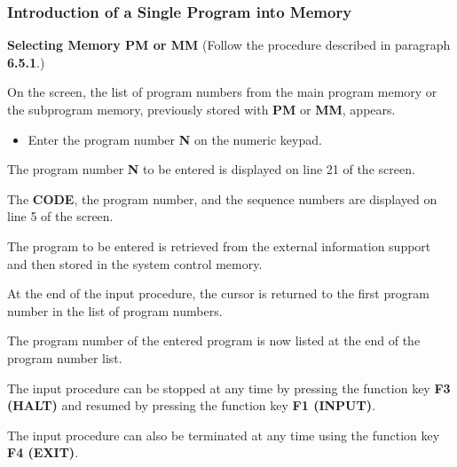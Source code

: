 \subsubsection{Introduction of a Single Program into Memory}

\textbf{Selecting Memory PM or MM}  
(Follow the procedure described in paragraph \textbf{6.5.1}.)

On the screen, the list of program numbers from the main program memory or the subprogram memory, previously stored with \textbf{PM} or \textbf{MM}, appears.

\begin{itemize}
    \item Enter the program number \textbf{N} on the numeric keypad.
\end{itemize}

\vspace{.5cm}

The program number \textbf{N} to be entered is displayed on line 21 of the screen.

\begin{itemize}
\end{itemize}

\vspace{.5cm}

\begin{itemize}
\end{itemize}

The \textbf{CODE}, the program number, and the sequence numbers are displayed on line 5 of the screen.

The program to be entered is retrieved from the external information support and then stored in the system control memory.

At the end of the input procedure, the cursor is returned to the first program number in the list of program numbers.

The program number of the entered program is now listed at the end of the program number list.

\notes

The input procedure can be stopped at any time by pressing the function key \textbf{F3 (HALT)} and resumed by pressing the function key \textbf{F1 (INPUT)}.

The input procedure can also be terminated at any time using the function key \textbf{F4 (EXIT)}.

